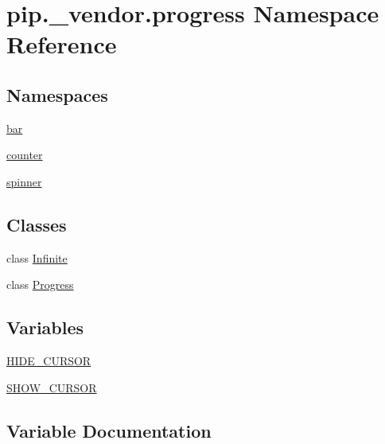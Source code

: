 \hypertarget{namespacepip_1_1__vendor_1_1progress}{}\section{pip.\+\_\+vendor.\+progress Namespace Reference}
\label{namespacepip_1_1__vendor_1_1progress}
\subsection*{Namespaces}
\begin{DoxyCompactItemize}
\item 
 \hyperlink{namespacepip_1_1__vendor_1_1progress_1_1bar}{bar}
\item 
 \hyperlink{namespacepip_1_1__vendor_1_1progress_1_1counter}{counter}
\item 
 \hyperlink{namespacepip_1_1__vendor_1_1progress_1_1spinner}{spinner}
\end{DoxyCompactItemize}
\subsection*{Classes}
\begin{DoxyCompactItemize}
\item 
class \hyperlink{classpip_1_1__vendor_1_1progress_1_1Infinite}{Infinite}
\item 
class \hyperlink{classpip_1_1__vendor_1_1progress_1_1Progress}{Progress}
\end{DoxyCompactItemize}
\subsection*{Variables}
\begin{DoxyCompactItemize}
\item 
\hyperlink{namespacepip_1_1__vendor_1_1progress_ae14bb679fb4fbef92d4a2a73c69cf003}{H\+I\+D\+E\+\_\+\+C\+U\+R\+S\+OR}
\item 
\hyperlink{namespacepip_1_1__vendor_1_1progress_aec81b7faa5ee1e5ec2fe9dc6c1c7dbf1}{S\+H\+O\+W\+\_\+\+C\+U\+R\+S\+OR}
\end{DoxyCompactItemize}


\subsection{Variable Documentation}
\mbox{\label{namespacepip_1_1__vendor_1_1progress_ae14bb679fb4fbef92d4a2a73c69cf003}} 
